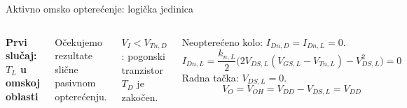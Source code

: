 \begin{frame}[label=09_1-s038]{Aktivno omsko opterećenje: logička jedinica}\setlength{\parskip}{2pt}\setlength{\abovedisplayskip}{4pt}\setlength{\belowdisplayskip}{4pt}\setlength{\abovedisplayshortskip}{3pt}\setlength{\belowdisplayshortskip}{3pt}
\begin{columns}[T,onlytextwidth]\centering {}\textbf{Prvi slučaj: $T_L$ u omskoj oblasti}
\par Očekujemo rezultate slične pasivnom opterećenju.
\medskip\par $V_I<V_{Tn,D}$: pogonski tranzistor $T_D$ je zakočen.\par Neopterećeno kolo: $I_{Dn,D}=I_{Dn,L}=0$.
\[I_{Dn,L}=\frac{k_{n,L}}2\bigl(2V_{DS,L}(V_{GS,L}-V_{Tn,L})-V_{DS,L}^2\bigr)=0\]
Radna tačka: $V_{DS,L}=0$.\[V_O=V_{OH}=V_{DD}-V_{DS,L}=V_{DD}\]
\end{columns}
\end{frame}

